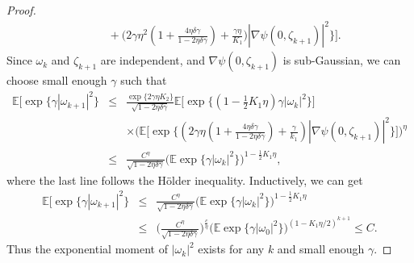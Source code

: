 \documentclass[12pt]{amsart}
\newtheorem{lemma}[theorem]{Lemma}
\theoremstyle{definition}
\theoremstyle{remark}
\numberwithin{equation}{section}
\newcommand{\dif}{\mathrm{d}}
\newcommand{\E}{\mathbb{E}}            %
\newcommand{\PP}{\mathbb{P}}
\begin{document}
\begin{proof}
\begin{eqnarray*}
	&&\quad+\big(2\gamma\eta^2(1+\frac{4 \eta \delta \gamma}{1-2 \eta \delta \gamma})+\frac{\gamma\eta}{K_1}\big)|\nabla \psi(0, \zeta_{k+1})|^2\big\}\Big].
\end{eqnarray*}
Since $\omega_k$ and $\zeta_{k+1}$ are independent, and $\nabla\psi(0,\zeta_{k+1})$ is sub-Gaussian, we can choose small enough $\gamma$ such that
\begin{eqnarray*}
	\E[\exp\{\gamma|\omega_{k+1}|^2\}
	&\le& \frac{\exp\{2\gamma\eta K_2\}}{\sqrt{1-2\eta\delta\gamma}}\E\big[\exp \big\{(1-\frac12K_1\eta)\gamma|\omega_k|^2\big\}\big] \\
	&&\times \Big( \E\big[\exp\big\{ (2\gamma\eta(1+\frac{4\eta\delta\gamma}{1-2\eta\delta\gamma})+\frac{\gamma}{k_1})|\nabla\psi(0,\zeta_{k+1})|^2   \big\}\big]  \Big)^\eta\\
	&\le& \frac{C^\eta}{\sqrt{1-2\eta\delta\gamma}}\big(\E\exp \{\gamma|\omega_k|^2\}\big)^{1-\frac12K_1\eta},
\end{eqnarray*}
where the last line follows the H\"older inequality. Inductively, we can get
\begin{eqnarray*}
	\E[\exp\{\gamma|\omega_{k+1}|^2\} &\le& \frac{C^\eta}{\sqrt{1-2\eta\delta\gamma}}\big(\E\exp \{\gamma|\omega_k|^2\}\big)^{1-\frac12K_1\eta}\\
	&\le& \Big( \frac{C^\eta}{\sqrt{1-2\eta\delta\gamma}} \Big)^\frac{c}{\eta}\big(\E\exp\{\gamma|\omega_0|^2\}\big)^{(1-K_1\eta/2)^{k+1}}\le C.
\end{eqnarray*}
Thus the exponential moment of $|\omega_k|^2$ exists for any $k$ and small enough $\gamma$.
\end{proof}

\end{document}
